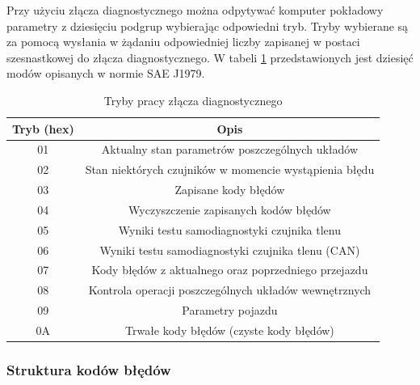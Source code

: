 \documentclass[12pt]{article} %
\numberwithin{equation}{subsection}
\numberwithin{figure}{section}
\numberwithin{table}{section}
\begin{document}
		\hspace{0.5cm}Przy użyciu złącza diagnostycznego można odpytywać komputer pokładowy parametry z dziesięciu podgrup wybierając odpowiedni tryb. Tryby wybierane są za pomocą wysłania w żądaniu odpowiedniej liczby zapisanej w postaci szesnastkowej do złącza diagnostycznego. W tabeli \ref{tab_pid_modes} przedstawionych jest dziesięć modów opisanych w normie SAE J1979.
		
		\begin{table}[ht]
\centering
\caption{Tryby pracy złącza diagnostycznego}
\label{tab_pid_modes}
\begin{tabular}{|c|c|}
\hline
\textbf{Tryb (hex)} & \textbf{Opis}                                                               \\ \hline
01                  & Aktualny stan parametrów poszczególnych układów                             \\ \hline
02                  & Stan niektórych czujników w momencie wystąpienia błędu                      \\ \hline
03                  & Zapisane kody błędów                                                        \\ \hline
04                  & Wyczyszczenie zapisanych kodów błędów            \\ \hline
05                  & Wyniki testu samodiagnostyki czujnika tlenu \\ \hline
06                  & Wyniki testu samodiagnostyki czujnika tlenu (CAN)                             \\ \hline
07                  & Kody błędów z aktualnego oraz poprzedniego przejazdu         \\ \hline
08                  & Kontrola operacji poszczególnych układów wewnętrznych                       \\ \hline
09                  & Parametry pojazdu                                                           \\ \hline
0A                  & Trwałe kody błędów (czyste kody błędów)                                     \\ \hline
\end{tabular}
\end{table}
		
		
		\newpage
		
		\subsubsection{Struktura kodów błędów}
		
\end{document}
